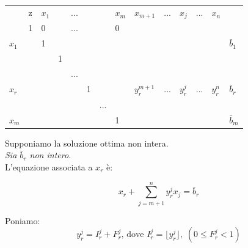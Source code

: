 \begin{table}[h]
	\centering
	\begin{tabular}{llllllllllllll}
		&                       z & $x_{1}$ &    & ... &     &      & $x_{m}$ & $x_{m+1}$     & ... & $x_{j}$     & ... & $x_{n}$     & \\ \cline{2-14}
		& \multicolumn{1}{|l|}{1} & 0       &    & ... &     &      & 0       &               &     &             &     &             & \multicolumn{1}{|l|}{} \\ \cline{2-14}
		$x_{1}$ & \multicolumn{1}{|l|}{}  & 1       &    &     &     &      &         &               &     &             &     &	           & \multicolumn{1}{|l|}{$\bar{b}_{1}$} \\
		& \multicolumn{1}{|l|}{}  &         & 1  &     &     &      &         &               &     &             &     &             & \multicolumn{1}{|l|}{} \\
		& \multicolumn{1}{|l|}{}  &         &    & ... &     &      &         &               &     &             &     &             & \multicolumn{1}{|l|}{} \\
		$x_{r}$ & \multicolumn{1}{|l|}{}  &         &    &     & 1   &      &         & $y_{r}^{m+1}$ & ... & $y_{r}^{j}$ & ... & $y_{r}^{n}$ & \multicolumn{1}{|l|}{$\bar{b}_{r}$} \\
		& \multicolumn{1}{|l|}{}  &         &    &     &     & ...  &         &               &     &             &     &             & \multicolumn{1}{|l|}{} \\
		$x_{m}$ & \multicolumn{1}{|l|}{}  &         &    &     &     &      & 1       &               &     &             &     &             & \multicolumn{1}{|l|}{$\bar{b}_{m}$} \\ \cline{2-14}
	\end{tabular}
\end{table}

Supponiamo la soluzione ottima non intera.\\

\emph{Sia $\bar{b}_{r}$ non intero.}
\\

L'equazione associata a $x_{r}$ è:

\begin{equation}\label{eq:2.20}
x_{r} + \displaystyle\sum_{j=m+1}^{n} y_{r}^{j} x_{j} = \bar{b}_{r}
\end{equation}

Poniamo:
\begin{equation}
y_{r}^{j} = I_{r}^{j} + F_{r}^{j}\text{, dove }I_{r}^{j} = \lfloor y_{r}^{j} \rfloor,\;(0 \le F_{r}^{j} < 1)
\end{equation}

